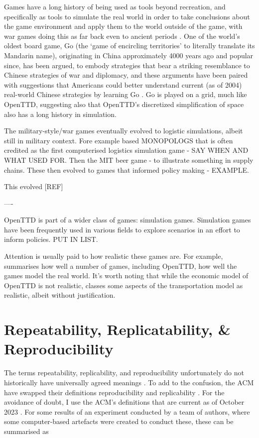 \documentclass[logo,msc]{infthesis}           %
\begin{document}
Games have a long history of being used as tools beyond recreation, and specifically as tools to simulate the real world in order to take conclusions about the game environment and apply them to the world outside of the game, with war games doing this as far back even to ancient periods \cite{mayer2009gaming}. One of the world's oldest board game, Go (the `game of encircling territories' to literally translate its Mandarin name), originating in China approximately 4000 years ago and popular since, has been argued, to embody strategies that bear a striking resemblance to Chinese strategies of war and diplomacy, and these arguments have been paired with suggestions that Americans could better understand current (as of 2004) real-world Chinese strategies by learning Go \cite{lai2004learning}. Go is played on a grid, much like OpenTTD, suggesting also that OpenTTD's discretized simplification of space also has a long history in simulation.

The military-style/war games eventually evolved to logistic simulations, albeit still in military context. Fore example based MONOPOLOGS \cite{jackson1959learning} that is often credited as the first computerised logistics simulation game - SAY WHEN AND WHAT USED FOR. Then the MIT beer game - to illustrate something in supply chains. These then evolved to games that informed policy making - EXAMPLE.


This evolved [REF]

----

OpenTTD is part of a wider class of games: simulation games. Simulation games have been frequently used in various fields to explore scenarios in an effort to inform policies. PUT IN LIST.

Attention is usually paid to how realistic these games are. For example, \cite{raghothama2013review} summarises how well a number of games, including OpenTTD, how well the games model the real world. It's worth noting that while the economic model of OpenTTD is not realistic, \cite{raghothama2013review} classes some aspects of the transportation model as realistic, albeit without justification.



\section{Repeatability, Replicatability, \& Reproducibility}



The terms repeatability, replicability, and reproducibility unfortunately do not historically have universally agreed meanings \cite{plesser_reproducibility_2018}. To add to the confusion, the ACM have swapped their definitions reproducibility and replicability \cite{association_for_computing_machiner_new_2020}. For the avoidance of doubt, I use the ACM's definitions that are current as of October 2023 \cite{association_for_computing_machiner_artifact_2020}. For some results of an experiment conducted by a team of authors, where some computer-based artefacts were created to conduct these, these can be summarised as
\end{document}
